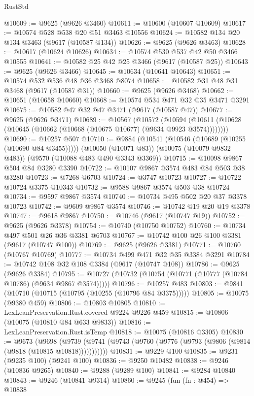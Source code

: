 \begin{lexlean}{RustStd}
\begin{coremodule}
{\begin{coremodule}
{{{{{{{{{{{{{{{{{{{{{{{{{{{{{{{{{@10609 := @9625 (@9626 @3460)
@10611 := @10600 (@10607 @10609)
@10617 := @10574 @528 @538 @20 @51 @3463 @10556
@10624 := @10582 @134 @20 @134 @3463 (@9617 (@10587 @134))
@10626 := @9625 (@9626 @3463)
@10628 := @10617 (@10624 @10626)
@10634 := @10574 @530 @537 @42 @50 @3466 @10555
@10641 := @10582 @25 @42 @25 @3466 (@9617 (@10587 @25))
@10643 := @9625 (@9626 @3466)
@10645 := @10634 (@10641 @10643)
@10651 := @10574 @532 @536 @48 @36 @3468 @8074
@10658 := @10582 @31 @48 @31 @3468 (@9617 (@10587 @31))
@10660 := @9625 (@9626 @3468)
@10662 := @10651 (@10658 @10660)
@10668 := @10574 @534 @471 @32 @35 @3471 @3291
@10675 := @10582 @47 @32 @47 @3471 (@9617 (@10587 @47))
@10677 := @9625 (@9626 @3471)
@10689 := @10567
    (@10572
      (@10594 (@10611 (@10628 (@10645 (@10662 (@10668 (@10675 @10677) (@9634 @9923 @3574))))))))
@10690 := @10257 @507
@10710 := @9884
    (@10541 (@10546 (@10689 (@10255 (@10690 @84 @3455)))))
    (@10050 (@10071 @83))
    (@10075 (@10079 @9832 @483))
    (@9570 (@10088 @483 @490 @3343 @3369))
@10715 := @10098 @9867 @504 @84 @3280 @3390
@10722 := @10107 @9867 @3574 @483 @84 @503 @38 @3280
@10723 := @7268 @6703
@10724 := @3747 @10723
@10727 := @10722 @10724 @3375 @10343
@10732 := @9588 @9867 @3574 @503 @38 @10724
@10734 := @9597 @9867 @3574
@10740 := @10734 @495 @502 @20 @37 @3378 @10723
@10742 := @9609 @9867 @3574
@10746 := @10742 @19 @20 @19 @3378
@10747 := @9618 @9867
@10750 := @10746 (@9617 (@10747 @19))
@10752 := @9625 (@9626 @3378)
@10754 := @10740 (@10750 @10752)
@10760 := @10734 @497 @501 @26 @36 @3381 @6703
@10767 := @10742 @100 @26 @100 @3381 (@9617 (@10747 @100))
@10769 := @9625 (@9626 @3381)
@10771 := @10760 (@10767 @10769)
@10777 := @10734 @499 @471 @32 @35 @3384 @3291
@10784 := @10742 @108 @32 @108 @3384 (@9617 (@10747 @108))
@10786 := @9625 (@9626 @3384)
@10795 := @10727 (@10732 (@10754 (@10771 (@10777 (@10784 @10786) (@9634 @9867 @3574)))))
@10796 := @10257 @483
@10803 := @9841 (@10710 (@10715 (@10795 (@10255 (@10796 @84 @3375)))))
@10805 := @10075 (@9380 @459)
@10806 := @10803 @10805
@10810 := LexLeanPreservation.Rust.covered @9224 @9226 @459
@10815 := @10806 (@10075 (@10810 @84 @633 @9833))
@10816 := LexLeanPreservation.Rust.isTemp
@10818 := @10075 (@10816 @3305)
@10830 := @9673
    (@9698 (@9739 (@9741 (@9743 (@9760 (@9776 (@9793 (@9806 (@9814 (@9818 (@10815 @10818)))))))))))
@10831 := @9229 @100
@10835 := @9231 (@9235 @100) (@9241 @100)
@10836 := @9250 @10482
@10838 := @9246 (@10836 @9265)
@10840 := @9288 (@9289 @100)
@10841 := @9284 @10840
@10843 := @9246 (@10841 @9314)
@10860 := @9245
    (fun (fn : @454) =>
    @10838
}}}}}}}}}}}}}}}}}}}}}}}}}}}}}}}}}
\end{coremodule}}
\end{coremodule}
\end{lexlean}
